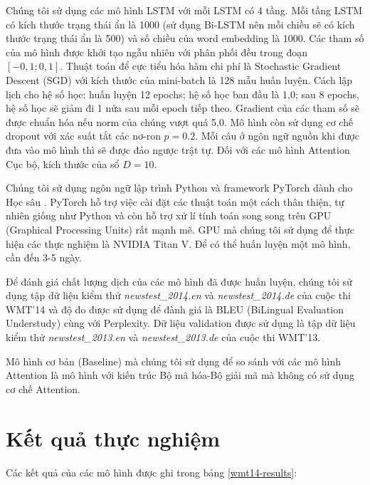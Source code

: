 Chúng tôi sử dụng các mô hình LSTM với mỗi LSTM có 4 tầng. Mỗi tầng LSTM có kích thước trạng thái ẩn là 1000 (sử dụng Bi-LSTM nên mỗi chiều sẽ có kích thước trạng thái ẩn là 500) và số chiều của word embedding là 1000. Các tham số của mô hình được khởi tạo ngẫu nhiên với phân phối đều trong đoạn $[-0,1; 0,1]$. Thuật toán để cực tiểu hóa hàm chi phí là Stochastic Gradient Descent (SGD) với kích thước của mini-batch là 128 mẫu huấn luyện. Cách lập lịch cho hệ số học: huấn luyện 12 epochs; hệ số học ban đầu là 1,0; sau 8 epochs, hệ số học sẽ giảm đi 1 nửa sau mỗi epoch tiếp theo. Gradient của các tham số sẽ được chuẩn hóa nếu norm của chúng vượt quá 5,0. Mô hình còn sử dụng cơ chế dropout với xác suất tắt các nơ-ron $p = 0.2$. Mỗi câu ở ngôn ngữ nguồn khi được đưa vào mô hình thì sẽ được đảo ngược trật tự. Đối với các mô hình Attention Cục bộ, kích thước của sổ $D = 10$.

Chúng tôi sử dụng ngôn ngữ lập trình Python và framework PyTorch dành cho Học sâu \cite{pytorchworkshop}. PyTorch hỗ trợ việc cài đặt các thuật toán một cách thân thiện, tự nhiên giống như Python và còn hỗ trợ xử lí tính toán song song trên GPU (Graphical Processing Units) rất mạnh mẽ. GPU mà chúng tôi sử dụng để thực hiện các thực nghiệm là NVIDIA Titan V. Để có thể huấn luyện một mô hình, cần đến 3-5 ngày.

Để đánh giá chất lượng dịch của các mô hình đã được huấn luyện, chúng tôi sử dụng tập dữ liệu kiểm thử \textit{newstest\_2014.en} và \textit{newstest\_2014.de} của cuộc thi WMT'14 và độ đo được sử dụng để đành giá là BLEU (BiLingual Evaluation Understudy) cùng với Perplexity. Dữ liệu validation được sử dụng là tập dữ liệu kiểm thử \textit{newstest\_2013.en} và \textit{newstest\_2013.de} của cuộc thi WMT'13.

Mô hình cơ bản (Baseline) mà chúng tôi sử dụng để so sánh với các mô hình Attention là mô hình với kiến trúc Bộ mã hóa-Bộ giải mã mà không có sử dụng cơ chế Attention.

\section{Kết quả thực nghiệm}
Các kết quả của các mô hình được ghi trong bảng \ref{wmt14-results}:

